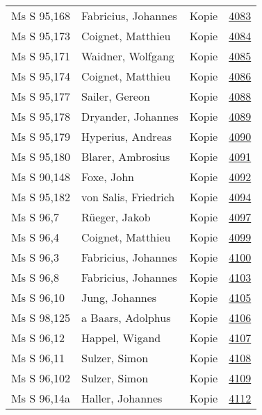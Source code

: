 \documentclass[10pt,a4paper,landscape]{report}
\begin{document}
\begin{longtable}{p{16cm}p{4cm}lr}
Ms S 95,168	&	Fabricius, Johannes	&	Kopie	&	\href{http://130.60.24.72/assignment/4083}{4083}\\
Ms S 95,173	&	Coignet, Matthieu	&	Kopie	&	\href{http://130.60.24.72/assignment/4084}{4084}\\
Ms S 95,171	&	Waidner, Wolfgang	&	Kopie	&	\href{http://130.60.24.72/assignment/4085}{4085}\\
Ms S 95,174	&	Coignet, Matthieu	&	Kopie	&	\href{http://130.60.24.72/assignment/4086}{4086}\\
Ms S 95,177	&	Sailer, Gereon	&	Kopie	&	\href{http://130.60.24.72/assignment/4088}{4088}\\
Ms S 95,178	&	Dryander, Johannes	&	Kopie	&	\href{http://130.60.24.72/assignment/4089}{4089}\\
Ms S 95,179	&	Hyperius, Andreas	&	Kopie	&	\href{http://130.60.24.72/assignment/4090}{4090}\\
Ms S 95,180	&	Blarer, Ambrosius	&	Kopie	&	\href{http://130.60.24.72/assignment/4091}{4091}\\
Ms S 90,148	&	Foxe, John	&	Kopie	&	\href{http://130.60.24.72/assignment/4092}{4092}\\
Ms S 95,182	&	von Salis, Friedrich	&	Kopie	&	\href{http://130.60.24.72/assignment/4094}{4094}\\
Ms S 96,7	&	Rüeger, Jakob	&	Kopie	&	\href{http://130.60.24.72/assignment/4097}{4097}\\
Ms S 96,4	&	Coignet, Matthieu	&	Kopie	&	\href{http://130.60.24.72/assignment/4099}{4099}\\
Ms S 96,3	&	Fabricius, Johannes	&	Kopie	&	\href{http://130.60.24.72/assignment/4100}{4100}\\
Ms S 96,8	&	Fabricius, Johannes	&	Kopie	&	\href{http://130.60.24.72/assignment/4103}{4103}\\
Ms S 96,10	&	Jung, Johannes	&	Kopie	&	\href{http://130.60.24.72/assignment/4105}{4105}\\
Ms S 98,125	&	a Baars, Adolphus	&	Kopie	&	\href{http://130.60.24.72/assignment/4106}{4106}\\
Ms S 96,12	&	Happel, Wigand	&	Kopie	&	\href{http://130.60.24.72/assignment/4107}{4107}\\
Ms S 96,11	&	Sulzer, Simon	&	Kopie	&	\href{http://130.60.24.72/assignment/4108}{4108}\\
Ms S 96,102	&	Sulzer, Simon	&	Kopie	&	\href{http://130.60.24.72/assignment/4109}{4109}\\
Ms S 96,14a	&	Haller, Johannes	&	Kopie	&	\href{http://130.60.24.72/assignment/4112}{4112}\\

\end{longtable}
\end{document}
